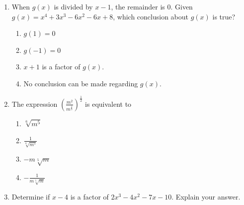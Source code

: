 \documentclass[12pt, oneside]{article}
\begin{document}
\begin{enumerate}
\item When $g(x)$ is divided by $x-1$, the remainder is 0. Given $g(x)= x^4+3x^3-6x^2-6x+8$, which conclusion about $g(x)$ is true?
\begin{enumerate}
    \item $g(1)=0$
    \item $g(-1)=0$
    \item $x+1$ is a factor of $g(x)$.
    \item No conclusion can be made regarding $g(x)$.
\end{enumerate} %

\item The expression $\displaystyle \left( \frac{m^2}{m^\frac{1}{3}}\right)^{\frac{1}{2}}$ is equivalent to 
\begin{enumerate}
    \item $\sqrt[6]{m^5}$
    \item $\displaystyle \frac{1}{\sqrt[6]{m^5}}$
    \item $-m \sqrt[5]{m}$
    \item $\displaystyle -\frac{1}{m \sqrt[5]{m}}$
\end{enumerate} %

\newpage
\item Determine if $x-4$ is a factor of $2x^3-4x^2-7x-10$. Explain your answer. %


\end{enumerate}
\end{document}
